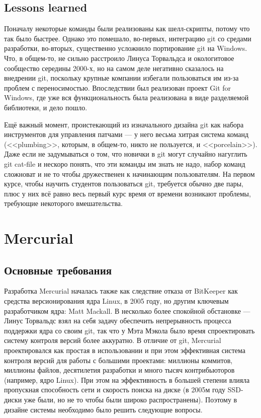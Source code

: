 \documentclass[a5paper]{article}
\begin{document}
\subsection{Lessons learned}

Поначалу некоторые команды были реализованы как шелл-скрипты, потому что так было быстрее. Однако это помешало, во-первых, интеграцию git со средами разработки, во-вторых, существенно усложнило портирование git на Windows. Что, в общем-то, не сильно расстроило Линуса Торвальдса и окологитовое сообщество середины 2000-х, но на самом деле негативно сказалось на внедрении git, поскольку крупные компании избегали пользоваться им из-за проблем с переносимостью. Впоследствии был реализован проект Git for Windows, где уже вся функциональность была реализована в виде разделяемой библиотеки, и дело пошло.

Ещё важный момент, проистекающий из изначального дизайна git как набора инструментов для управления патчами --- у него весьма хитрая система команд (<<plumbing>>, которым, в общем-то, никто не пользуется, и <<porcelain>>). Даже если не задумываться о том, что новички в git могут случайно нагуглить git cat-file и нескоро понять, что эти команды им знать не надо, набор команд сложноват и не то чтобы дружественен к начинающим пользователям. На первом курсе, чтобы научить студентов пользоваться git, требуется обычно две пары, плюс у них всё равно весь первый курс время от времени возникают проблемы, требующие некоторого вмешательства.

\section{Mercurial}

\subsection{Основные требования}

Разработка Mercurial началась также как следствие отказа от BitKeeper как средства версионирования ядра Linux, в 2005 году, но другим ключевым разработчиком ядра: Matt Mackall. В несколько более спокойной обстановке --- Линус Торвальдс взял на себя задачу обеспечить непрерывность процесса поддержки ядра со своим git, так что у Мэта Мэкола было время спроектировать систему контроля версий более аккуратно. В отличие от git, Mercurial проектировался как простая в использовании и при этом эффективная система контроля версий для работы с большими проектами: миллионы коммитов, миллионы файлов, десятилетия разработки и много тысяч контрибьюторов (например, ядро Linux). При этом на эффективность в большей степени влияла пропускная способность сети и скорость поиска на диске (в 2005м году SSD-диски уже были, но не то чтобы были широко распространены). Поэтому в дизайне системы необходимо было решить следующие вопросы.
\end{document}
